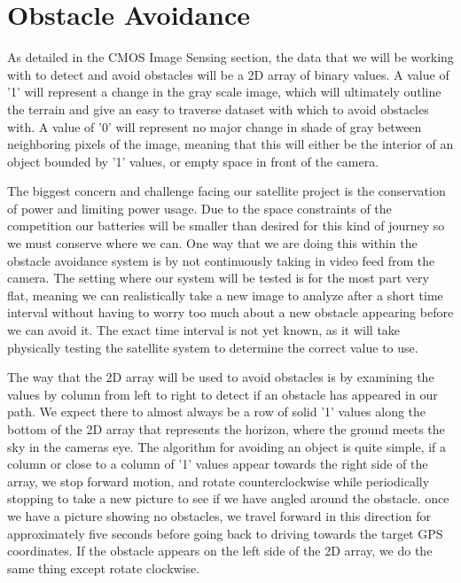 \documentclass[10pt,letterpaper,onecolumn,journal]{IEEEtran}
\begin{document}
\section{Obstacle Avoidance}
\par
As detailed in the CMOS Image Sensing section, the data that we will be working with to detect and avoid obstacles will be a 2D array of binary values. A value of '1' will represent a change in the gray scale image, which will ultimately outline the terrain and give an easy to traverse dataset with which to avoid obstacles with. A value of '0' will represent no major change in shade of gray between neighboring pixels of the image, meaning that this will either be the interior of an object bounded by '1' values, or empty space in front of the camera.\vspace{.3cm}
\par
The biggest concern and challenge facing our satellite project is the conservation of power and limiting power usage. Due to the space constraints of the competition our batteries will be smaller than desired for this kind of journey so we must conserve where we can. One way that we are doing this within the obstacle avoidance system is by not continuously taking in video feed from the camera. The setting where our system will be tested is for the most part very flat, meaning we can realistically take a new image to analyze after a short time interval without having to worry too much about a new obstacle appearing before we can avoid it. The exact time interval is not yet known, as it will take physically testing the satellite system to determine the correct value to use.\vspace{.3cm}
\par
The way that the 2D array will be used to avoid obstacles is by examining the values by column from left to right to detect if an obstacle has appeared in our path. We expect there to almost always be a row of solid '1' values along the bottom of the 2D array that represents the horizon, where the ground meets the sky in the cameras eye. The algorithm for avoiding an object is quite simple, if a column or close to a column of '1' values appear towards the right side of the array, we stop forward motion, and rotate counterclockwise while periodically stopping to take a new picture to see if we have angled around the obstacle. once we have a picture showing no obstacles, we travel forward in this direction for approximately five seconds before going back to driving towards the target GPS coordinates. If the obstacle appears on the left side of the 2D array, we do the same thing except rotate clockwise.\vspace{.3cm}
\end{document}
